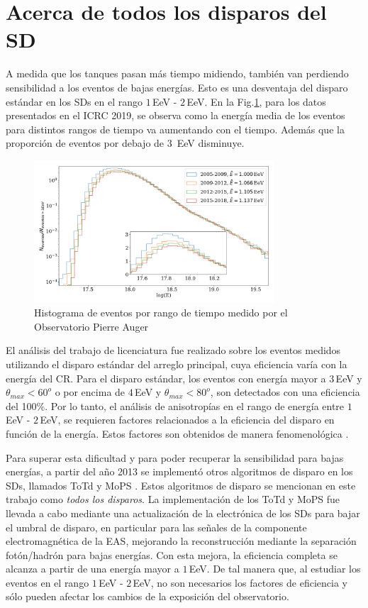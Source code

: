 \section{Acerca de todos los disparos del SD}

A medida que los tanques pasan más tiempo midiendo, también van perdiendo sensibilidad a los eventos de bajas energías. Esto es una desventaja del disparo estándar en los SDs en el rango $1\,$EeV - $2\,$EeV. En la Fig.\ref{fig:futuro}, para los datos presentados en el ICRC 2019, se observa como la energía media de los eventos para distintos rangos de tiempo va aumentando con el tiempo. Además que la proporción de eventos por debajo de $3\,$ EeV disminuye. 

\begin{figure}[H]
	\centering
	\includegraphics[width=0.8\textwidth]{histograma_evolucion_eventos.png}
	\caption{Histograma de eventos por rango de tiempo medido por el Observatorio Pierre Auger}
	\label{fig:futuro}
\end{figure}


El análisis del trabajo de licenciatura fue realizado sobre los eventos medidos utilizando el disparo estándar del arreglo principal, cuya eficiencia varía con la energía del CR. Para el disparo estándar, los eventos con energía mayor a $3\,$EeV y $\theta_{max}<60^o$ o  por encima de $4\,$EeV y $\theta_{max}<80^o$, son detectados con una eficiencia del 100\%. Por lo tanto, el análisis de anisotropías en el rango de energía entre $1\,$EeV - $2\,$EeV, se requieren factores relacionados a la eficiencia del disparo en función de la energía. Estos factores son obtenidos de manera fenomenológica \cite{taborda}. 

Para superar esta dificultad y para poder recuperar la sensibilidad para bajas energías, a partir del año 2013  se implementó otros algoritmos de disparo en los SDs, llamados ToTd y MoPS \cite{pierre2013plans}. Estos algoritmos de disparo se mencionan en este trabajo como \textit{todos los disparos}. La implementación de los ToTd y MoPS fue llevada a cabo mediante una actualización de la electrónica de los SDs para bajar el umbral de disparo, en particular para las señales de la componente electromagnética de la EAS, mejorando la reconstrucción mediante la separación fotón/hadrón para bajas energías. Con esta mejora, la eficiencia completa se alcanza a partir de una energía mayor a $1\,$EeV. De tal manera que, al estudiar los eventos en el rango $1\,$EeV - $2\,$EeV,  no son necesarios los factores de eficiencia y sólo pueden afectar los cambios de la exposición del observatorio.


